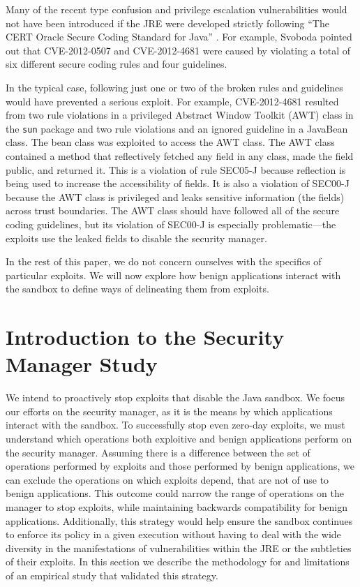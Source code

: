 \documentclass{sig-alternate}
\begin{document}
Many of the recent type confusion and privilege escalation vulnerabilities
would not have been introduced if the JRE were developed strictly
following ``The CERT Oracle Secure Coding Standard for Java'' \cite{long_cert_2011}.
For example, Svoboda \cite{svoboda_anatomy_blog_2013,svoboda_anatomy_2014}
pointed out that CVE-2012-0507 and CVE-2012-4681 were caused by violating
a total of six different secure coding rules and four guidelines. 

In the typical case, following just one or two of the broken rules
and guidelines would have prevented a serious exploit. For example,
CVE-2012-4681 resulted from two rule violations in a privileged Abstract
Window Toolkit (AWT) class in the \texttt{sun} package and two rule
violations and an ignored guideline in a JavaBean class. The bean
class was exploited to access the AWT class. The AWT class contained
a method that reflectively fetched any field in any class, made the
field public, and returned it. This is a violation of rule SEC05-J
because reflection is being used to increase the accessibility of
fields. It is also a violation of SEC00-J because the AWT class is
privileged and leaks sensitive information (the fields) across trust
boundaries. The AWT class should have followed all of the secure coding
guidelines, but its violation of SEC00-J is especially problematic---the
exploits use the leaked fields to disable the security manager. 

In the rest of this paper, we do not concern ourselves with the specifics
of particular exploits. We will now explore how benign applications interact with the sandbox to define ways of delineating them from exploits. 


\section{Introduction to the Security Manager Study}\label{sec:Security-Manager-Study}

We intend to proactively stop exploits that disable the Java sandbox.
We focus our efforts on the security manager, as it is the means by
which applications interact with the sandbox. To successfully stop
even zero-day exploits, we must understand which operations both exploitive
and benign applications perform on the security manager. Assuming
there is a difference between the set of operations performed by exploits
and those performed by benign applications, we can exclude the operations
on which exploits depend, that are not of use to benign applications.
This outcome could narrow the range of operations on the manager to
stop exploits, while maintaining backwards compatibility for benign
applications. Additionally, this strategy would help ensure the sandbox
continues to enforce its policy in a given execution without having
to deal with the wide diversity in the manifestations of vulnerabilities
within the JRE or the subtleties of their exploits. In this section
we describe the methodology for and limitations of an empirical study
that validated this strategy.
\end{document}
